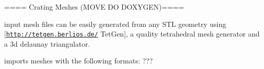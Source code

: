 ==== Crating Meshes (M\+O\+V\+E D\+O D\+O\+X\+Y\+G\+E\+N)====

input mesh files can be easily generated from any S\+T\+L geometry using \mbox{[}\href{http://tetgen.berlios.de/}{\tt http\+://tetgen.\+berlios.\+de/} Tet\+Gen\mbox{]}, a quality tetrahedral mesh generator and a 3d delaunay triangulator.

imports meshes with the following formats\+: ??? 